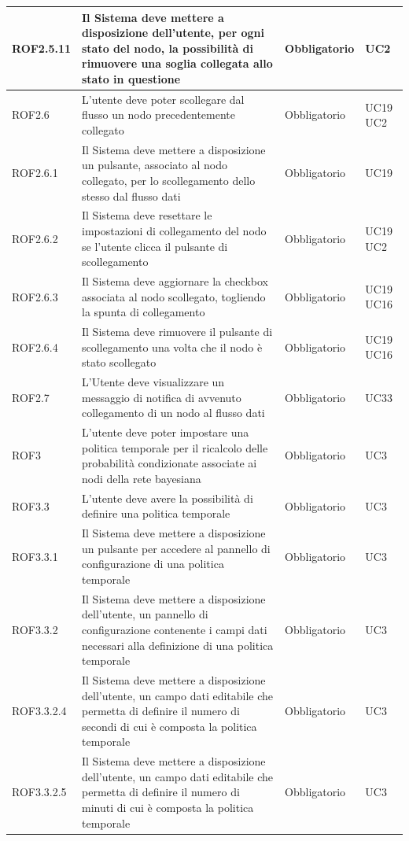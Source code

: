 \begin{center}
\begin{longtable}[c]{|m{}|m{}|m{}|m{}|}
\hline
ROF2.5.11 & Il Sistema deve mettere a disposizione dell’utente, per ogni stato del nodo, la possibilità di rimuovere una soglia collegata allo stato in questione & Obbligatorio & UC2 \\
\hline
\rowcolor{grigio}ROF2.6 & L'utente deve poter scollegare dal flusso un nodo precedentemente collegato & Obbligatorio & UC19 UC2\\
\hline
ROF2.6.1 & Il Sistema deve mettere a disposizione un pulsante, associato al nodo collegato, per lo scollegamento dello stesso dal flusso dati & Obbligatorio & UC19\\
\hline
\rowcolor{grigio}ROF2.6.2 & Il Sistema deve resettare le impostazioni di collegamento del nodo se l'utente clicca il pulsante di scollegamento & Obbligatorio & UC19 UC2\\
\hline
ROF2.6.3 & Il Sistema deve aggiornare la checkbox associata al nodo scollegato, togliendo la spunta di collegamento & Obbligatorio & UC19 UC16\\
\hline
\rowcolor{grigio}ROF2.6.4 & Il Sistema deve rimuovere il pulsante di scollegamento una volta che il nodo è stato scollegato & Obbligatorio & UC19 UC16\\
\hline
ROF2.7 & L'Utente deve visualizzare un messaggio di notifica di avvenuto collegamento di un nodo al flusso dati & Obbligatorio & UC33\\
\hline
\rowcolor{grigio}ROF3 & L'utente deve poter impostare una politica temporale per il ricalcolo delle probabilità condizionate associate ai nodi della rete bayesiana & Obbligatorio & UC3\\
\hline
ROF3.3 & L'utente deve avere la possibilità di definire una politica temporale & Obbligatorio & UC3\\
\hline
\rowcolor{grigio}ROF3.3.1 & Il Sistema deve mettere a disposizione un pulsante per accedere al pannello di configurazione di una politica temporale & Obbligatorio & UC3\\
\hline
ROF3.3.2 & Il Sistema deve mettere a disposizione dell'utente, un pannello di configurazione contenente i campi dati necessari alla definizione di una politica temporale & Obbligatorio & UC3\\
\hline
\rowcolor{grigio}ROF3.3.2.4 & Il Sistema deve mettere a disposizione dell'utente, un campo dati editabile che permetta di definire il numero di secondi di cui è composta la politica temporale & Obbligatorio & UC3\\
\hline
ROF3.3.2.5 & Il Sistema deve mettere a disposizione dell'utente, un campo dati editabile che permetta di definire il numero di minuti di cui è composta la politica temporale & Obbligatorio & UC3\\

\end{longtable}
\end{center}
